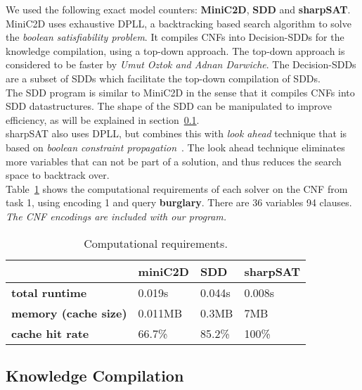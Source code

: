 We used the following exact model counters: \textbf{MiniC2D}, \textbf{SDD} and \textbf{sharpSAT}.
\\[2ex]
MiniC2D uses exhaustive DPLL, a backtracking based search algorithm to solve the \textit{boolean satisfiability problem}. It compiles CNFs into Decision-SDDs for the knowledge compilation, using a top-down approach. The top-down approach is considered to be faster by \textit{Umut Oztok and Adnan Darwiche}\cite{oztok2015top}. The Decision-SDDs are a subset of SDDs which facilitate the top-down compilation of SDDs.
\\[2ex]
The SDD program is similar to MiniC2D in the sense that it compiles CNFs into SDD datastructures. The shape of the SDD can be manipulated to improve efficiency, as will be explained in section~\ref{subsec:knowledgecompilation}.
\\[2ex]
sharpSAT also uses DPLL, but combines this with \textit{look ahead} technique that is based on \textit{boolean constraint propagation}~\cite{thurley2006sharpsat}. The look ahead technique eliminates more variables that can not be part of a solution, and thus reduces the search space to backtrack over.
\\[2ex]
Table~\ref{table:computationalrequirements} shows the computational requirements of each solver on the CNF from task 1, using encoding 1 and query \textbf{burglary}. There are 36 variables 94 clauses. \textit{The CNF encodings are included with our program.}

\begin{table}[h]
	\centering
	\caption{Computational requirements.}
	\label{table:computationalrequirements}
	\begin{tabular}{l|l|l|l}
		\textbf{}        & \textbf{miniC2D} & \textbf{SDD} & \textbf{sharpSAT} \\ \hline
		\textbf{total runtime} &  0.019s  &   0.044s   &   0.008s  \\ \hline
		\textbf{memory (cache size)}  &  0.011MB  &   0.3MB &   7MB  \\ \hline
		\textbf{cache hit rate}  & 66.7\%  & 85.2\% &   100\%
	\end{tabular}
\end{table}

\subsection{Knowledge Compilation}\label{subsec:knowledgecompilation}
